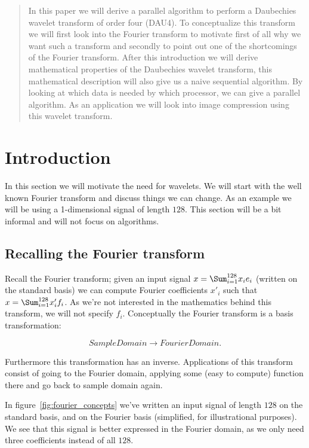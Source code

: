 
\begin{abstract}
In this paper we will derive a parallel algorithm to perform a Daubechies wavelet transform of order four (DAU4). To conceptualize this transform we will first look into the Fourier transform to motivate first of all why we want such a transform and secondly to point out one of the shortcomings of the Fourier transform. After this introduction we will derive mathematical properties of the Daubechies wavelet transform, this mathematical description will also give us a naive sequential algorithm. By looking at which data is needed by which processor, we can give a parallel algorithm. As an application we will look into image compression using this wavelet transform.
\end{abstract}


\section{Introduction}
\label{sec:intro}
In this section we will motivate the need for wavelets. We will start with the well known Fourier transform and discuss things we can change. As an example we will be using a 1-dimensional signal of length $128$. This section will be a bit informal and will not focus on algorithms.

\subsection{Recalling the Fourier transform}
Recall the Fourier transform; given an input signal $x = \Sum_{i=1}^{128} x_i e_i$ (written on the standard basis) we can compute Fourier coefficients $x'_i$ such that $x = \Sum_{i=1}^{128} x'_i f_i$. As we're not interested in the mathematics behind this transform, we will not specify $f_i$. Conceptually the Fourier transform is a basis transformation:

$$ SampleDomain \to FourierDomain. $$

Furthermore this transformation has an inverse. Applications of this transform consist of going to the Fourier domain, applying some (easy to compute) function there and go back to sample domain again.

In figure~\ref{fig:fourier_concepts} we've written an input signal of length $128$ on the standard basis, and on the Fourier basis (simplified, for illustrational purposes). We see that this signal is better expressed in the Fourier domain, as we only need three coefficients instead of all $128$.

